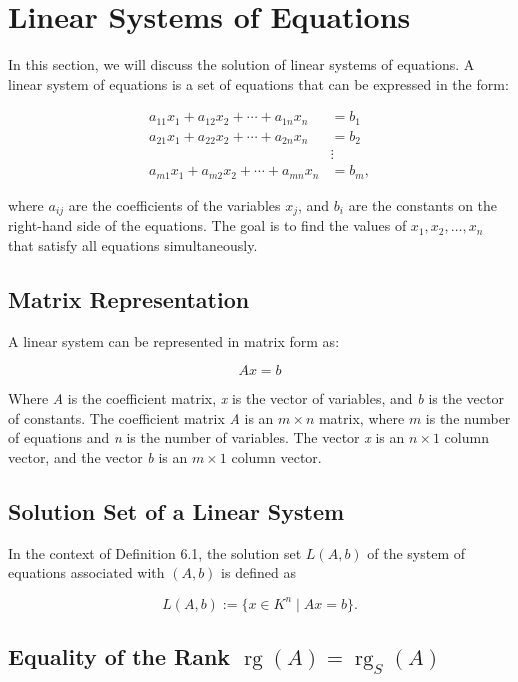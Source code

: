 \newpage
\section{Linear Systems of Equations}

In this section, we will discuss the solution of linear systems of equations. A linear system of 
equations is a set of equations that can be expressed in the form:

\begin{align*}
	a_{11}x_1 + a_{12}x_2 + \cdots + a_{1n}x_n & = b_1  \\
	a_{21}x_1 + a_{22}x_2 + \cdots + a_{2n}x_n & = b_2  \\
	& \vdots \\
	a_{m1}x_1 + a_{m2}x_2 + \cdots + a_{mn}x_n & = b_m,
\end{align*}

where \( a_{ij} \) are the coefficients of the variables \( x_j \), and \( b_i \) are the constants 
on the right-hand side of the equations. The goal is to find the values of \( x_1, x_2, \ldots, x_n \) 
that satisfy all equations simultaneously.

\subsection{Matrix Representation}

A linear system can be represented in matrix form as:

\[
	A x = b
\]

Where \emph{A} is the coefficient matrix, \emph{x} is the vector of variables, and \emph{b} is the vector 
of constants. The coefficient matrix \emph{A} is an \( m \times n \) matrix, where \( m \) is the number 
of equations and \emph{n} is the number of variables. The vector \emph{x} is an \( n \times 1 \) column 
vector, and the vector \emph{b} is an \( m \times 1 \) column vector. 


\subsection{Solution Set of a Linear System}

In the context of Definition 6.1, the solution set \( L(A, b) \) of the system of equations associated 
with \( (A, b) \) is defined as

\[
	L(A, b) := \{ x \in K^n \mid Ax = b \}.
\]

\subsection{Equality of the Rank \texorpdfstring{\(\operatorname{rg}(A) = \operatorname{rg}_S(A)\)}{}}

